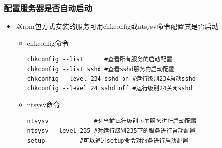 \documentclass[xcolor=svgnames,presentation]{beamer}
\begin{document}
\begin{frame}[fragile]
\frametitle{配置服务器是否自动启动}
\label{sec-5-3}
\begin{itemize}

\item 以rpm包方式安装的服务可用chkconfig或ntsysv命令配置其是否启动
\label{sec-5-3-1}%
\begin{itemize}

\item chkconfig命令\\
\label{sec-5-3-1-1}%
\begin{verbatim}
chkconfig --list      #查看所有服务的启动配置
chkconfig --list sshd #查看sshd服务的启动配置
chkconfig --level 234 sshd on #运行级别234启动sshd
chkconfig --level 24 sshd off #运行级别24关闭sshd
\end{verbatim}

\item ntsysv命令\\
\label{sec-5-3-1-2}%
\begin{verbatim}
ntsysv             #对当前运行级别下的服务进行启动配置
ntsysv --level 235 #对运行级别235下的服务进行启动配置
setup          #可以通过setup命令对服务进行启动配置
\end{verbatim}
\end{itemize} %
\end{itemize} %
\end{frame}
\end{document}
